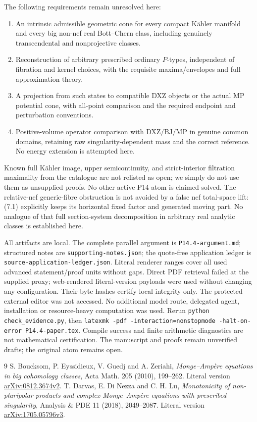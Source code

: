\documentclass[11pt]{article}
\theoremstyle{remark}\newtheorem{remark}[theorem]{Remark}
\begin{document}
The following requirements remain unresolved here:
\begin{enumerate}
\item An intrinsic admissible geometric cone for every compact
K\"ahler manifold and every big non-nef real Bott--Chern class,
including genuinely transcendental and nonprojective classes.
\item Reconstruction of arbitrary prescribed ordinary $P$-types,
independent of fibration and kernel choices, with the requisite
maxima/envelopes and full approximation theory.
\item A projection from such states to compatible DXZ objects or
the actual MP potential cone, with all-point comparison and the
required endpoint and perturbation conventions.
\item Positive-volume operator comparison with DXZ/BJ/MP in
genuine common domains, retaining raw singularity-dependent mass
and the correct reference. No energy extension is attempted here.
\end{enumerate}
Known full K\"ahler image, upper semicontinuity, and strict-interior
filtration maximality from the catalogue are not relisted as open;
we simply do not use them as unsupplied proofs. No other active
P14 atom is claimed solved.
The relative-nef generic-fibre obstruction is not avoided by a
false nef total-space lift: (7.1) explicitly keeps its horizontal
fixed factor and generated moving part. No analogue of that full
section-system decomposition in arbitrary real analytic classes
is established here.

All artifacts are local. The complete parallel argument is
\texttt{P14.4-argument.md}; structured notes are
\texttt{supporting-notes.json}; the quote-free application ledger is
\texttt{source-application-\allowbreak ledger.json}. Literal renderer ranges
cover all used advanced statement/proof units without gaps.
Direct PDF retrieval failed at the supplied proxy; web-rendered
literal-version payloads were used without changing any configuration.
Their byte hashes certify local integrity only.
The protected external editor was not accessed.
No additional model route, delegated agent, installation or
resource-heavy computation was used.
Rerun \texttt{python check\_evidence.py}, then
\texttt{latexmk -pdf -interaction=nonstopmode -halt-on-error
P14.4-paper.tex}. Compile success and finite arithmetic diagnostics
are not mathematical certification. The manuscript and proofs
remain unverified drafts; the original atom remains open.

\begin{thebibliography}{9}
 S. Boucksom, P. Eyssidieux, V. Guedj and A. Zeriahi,
\emph{Monge--Amp\`ere equations in big cohomology classes},
Acta Math. 205 (2010), 199--262.
Literal version \href{https://arxiv.org/pdf/0812.3674v2}{arXiv:0812.3674v2}.
 T. Darvas, E. Di Nezza and C. H. Lu,
\emph{Monotonicity of non-pluripolar products and complex
Monge--Amp\`ere equations with prescribed singularity},
Analysis \& PDE 11 (2018), 2049--2087.
Literal version \href{https://arxiv.org/pdf/1705.05796v3}{arXiv:1705.05796v3}.
\end{thebibliography}
\end{document}

